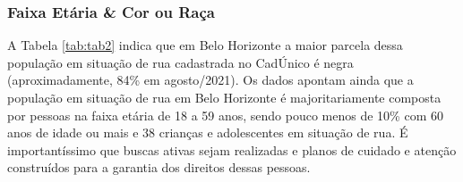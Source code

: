 \documentclass[12pt]{article}
\begin{document}
\subsubsection{Faixa Etária \& Cor ou Raça}

A Tabela \ref{tab:tab2} indica que em Belo Horizonte a maior parcela dessa população em situação de rua cadastrada no CadÚnico é negra (aproximadamente, 84\% em agosto/2021). Os dados apontam ainda que a população em situação de rua em Belo Horizonte é majoritariamente composta por pessoas na faixa etária de 18 a 59 anos, sendo pouco menos de 10\% com 60 anos de idade ou mais e 38 crianças e adolescentes em situação de rua. É importantíssimo que buscas ativas sejam realizadas e planos de cuidado e atenção construídos para a garantia dos direitos dessas pessoas.\\
\end{document}
